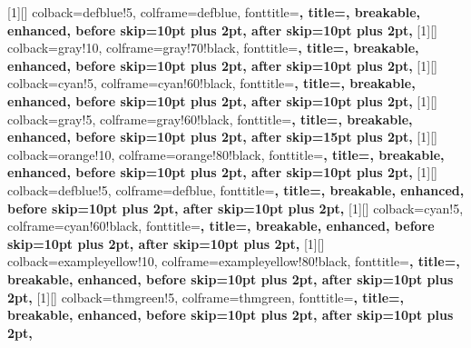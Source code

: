 [1][\relax]{
  colback=defblue!5, colframe=defblue, fonttitle=\bfseries,
  title={}, breakable, enhanced,
  before skip=10pt plus 2pt, after skip=10pt plus 2pt,
}
[1][\relax]{
  colback=gray!10, colframe=gray!70!black, fonttitle=\bfseries,
  title={}, breakable, enhanced,
  before skip=10pt plus 2pt, after skip=10pt plus 2pt,
}
[1][\relax]{
  colback=cyan!5, colframe=cyan!60!black, fonttitle=\bfseries,
  title={}, breakable, enhanced,
  before skip=10pt plus 2pt, after skip=10pt plus 2pt,
}
[1][\relax]{
  colback=gray!5, colframe=gray!60!black, fonttitle=\bfseries\Large,
  title={}, breakable, enhanced,
  before skip=10pt plus 2pt, after skip=15pt plus 2pt,
}
[1][\relax]{
  colback=orange!10, colframe=orange!80!black, fonttitle=\bfseries,
  title={}, breakable, enhanced,
  before skip=10pt plus 2pt, after skip=10pt plus 2pt,
}
[1][\relax]{
  colback=defblue!5, colframe=defblue, fonttitle=\bfseries,
  title={}, breakable, enhanced,
  before skip=10pt plus 2pt, after skip=10pt plus 2pt,
}
[1][\relax]{
  colback=cyan!5, colframe=cyan!60!black, fonttitle=\bfseries,
  title={}, breakable, enhanced,
  before skip=10pt plus 2pt, after skip=10pt plus 2pt,
}
[1][\relax]{
  colback=exampleyellow!10, colframe=exampleyellow!80!black, fonttitle=\bfseries,
  title={}, breakable, enhanced,
  before skip=10pt plus 2pt, after skip=10pt plus 2pt,
}
[1][\relax]{
  colback=thmgreen!5, colframe=thmgreen, fonttitle=\bfseries,
  title={}, breakable, enhanced,
  before skip=10pt plus 2pt, after skip=10pt plus 2pt,
}
\newenvironment{prop}[1][]{\begin{proposition}[#1]}{\end{proposition}}


